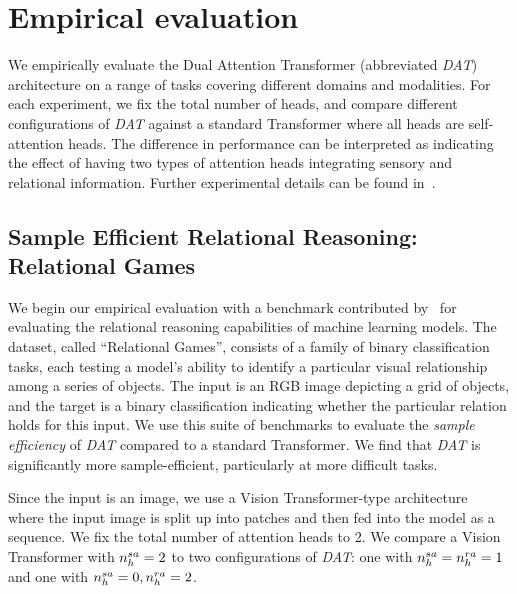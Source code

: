 \section{Empirical evaluation}\label{sec:experiments}

We empirically evaluate the Dual Attention Transformer (abbreviated \textit{DAT}) architecture on a range of tasks covering different domains and modalities. For each experiment, we fix the total number of heads, and compare different configurations of \textit{DAT} against a standard Transformer where all heads are self-attention heads. The difference in performance can be interpreted as indicating the effect of having two types of attention heads integrating sensory and relational information. Further experimental details can be found in~.

\subsection{Sample Efficient Relational Reasoning: Relational Games}\label{ssec:relgames}

We begin our empirical evaluation with a benchmark contributed by~\citet{shanahanExplicitlyRelationalNeurala} for evaluating the relational reasoning capabilities of machine learning models. The dataset, called ``Relational Games'', consists of a family of binary classification tasks, each testing a model's ability to identify a particular visual relationship among a series of objects. The input is an RGB image depicting a grid of objects, and the target is a binary classification indicating whether the particular relation holds for this input. We use this suite of benchmarks to evaluate the \textit{sample efficiency} of \textit{DAT} compared to a standard Transformer. We find that \textit{DAT} is significantly more sample-efficient, particularly at more difficult tasks. %

Since the input is an image, we use a Vision Transformer-type architecture~\citep{dosovitskiyImageWorth16x162020} where the input image is split up into patches and then fed into the model as a sequence. We fix the total number of attention heads to 2. We compare a Vision Transformer with $n_h^{sa} = 2$ to two configurations of \textit{DAT}: one with $n_h^{sa} =  n_h^{ra} = 1$ and one with $n_h^{sa} = 0, n_h^{ra} = 2$.

